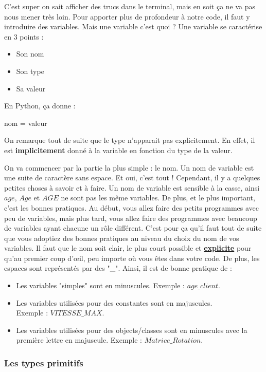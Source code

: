 \documentclass[a4paper,12pt]{article}
\begin{document}
C'est super on sait afficher des trucs dans le terminal, mais en soit ça ne va pas nous mener très loin.
Pour apporter plus de profondeur à notre code, il faut y introduire des variables. Mais une variable c'est quoi ? Une variable se caractérise en 3 points :
\begin{itemize}
    \item Son nom
    \item Son type
    \item Sa valeur
\end{itemize}
En Python, ça donne :
\begin{pythoncode}
    nom = valeur
\end{pythoncode}
{\color{cyan}
On remarque tout de suite que le type n'apparait pas explicitement. En effet, il est \textbf{implicitement} donné à la variable en fonction du type de la valeur.\newline
}

On va commencer par la partie la plus simple : le nom. Un nom de variable est une suite de caractère sans espace. Et oui, c'est tout !
Cependant, il y a quelques petites choses à savoir et à faire. Un nom de variable est sensible à la casse, ainsi $age$, $Age$ et $AGE$ ne sont pas les même variables.\newline
De plus, et le plus important, c'est les bonnes pratiques. Au début, vous allez faire des petits programmes avec peu de variables, mais plus tard, 
vous allez faire des programmes avec beaucoup de variables ayant chacune un rôle différent. C'est pour ça qu'il faut tout de suite que vous adoptiez des bonnes pratiques au niveau du choix du nom de vos variables. 
Il faut que le nom soit clair, le plus court possible et \textbf{\underline{explicite}} pour qu'au premier coup d'œil, peu importe où vous êtes dans votre code. 
De plus, les espaces sont représentés par des "\_".
Ainsi, il est de bonne pratique de : 
\begin{itemize}
    \item Les variables "simples" sont en minuscules. Exemple : $age\_client$.
    \item Les variables utilisées pour des constantes sont en majuscules. \\
        Exemple : $VITESSE\_MAX$.
    \item Les variables utilisées pour des objects/classes sont en minuscules avec la première lettre en majuscule. Exemple : $Matrice\_Rotation$.
\end{itemize}

\subsubsection{Les types primitifs}
\end{document}
